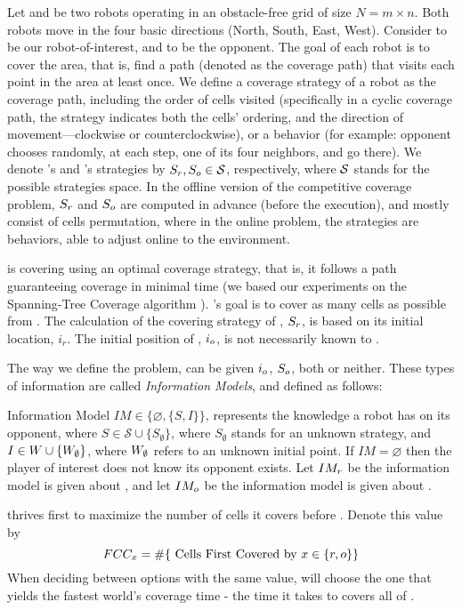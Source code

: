 Let \rob and \opp be two robots operating in an obstacle-free grid \w of size $N=m \times n$. Both robots move in the four basic directions (North, South, East, West). Consider \rob to be our robot-of-interest, and \opp to be the opponent. 
The goal of each robot is to cover the area, that is, find a path (denoted as the coverage path) that visits  each point in the area at least once. We define a coverage strategy of a robot as the coverage path, including the order of cells visited (specifically in a cyclic coverage path, the strategy indicates both the cells' ordering, and the direction of movement---clockwise or counterclockwise), or a behavior (for example: opponent chooses randomly, at each step, one of its four neighbors, and go there). We denote \rob's and \opp's strategies by $S_r,S_o\in \mathcal{S}$, respectively, where $\cal{S}$ stands for the possible strategies space. In the offline version of the competitive coverage problem, $S_r$ and $S_o$ are computed in advance (before the execution), and mostly consist of cells permutation, where in the online problem, the strategies are behaviors, able to adjust online to the environment.

\opp is covering \w using an optimal coverage strategy, that is, it follows a path guaranteeing coverage in minimal time (we based our experiments on the Spanning-Tree Coverage algorithm \cite{gabriely2001spanning}). \rob's goal is to cover as many cells as possible from . The calculation of the covering strategy of \rob, $S_r$, is based on its initial location, $i_r$. The initial position of \opp, $i_o$, is not necessarily known to \rob.

The way we define the problem, \rob can be given $i_o$, $S_o$, both or neither. These types of information are called {\em Information Models}, and defined as follows:
\begin{definition}
Information Model $IM \in \lbrace \varnothing, \lbrace S,I\rbrace \rbrace$, represents the knowledge a robot has on its opponent, where $S\in \mathcal{S} \cup \lbrace S_\emptyset \rbrace$, where $S_\emptyset$ stands for an unknown strategy, and $I \in W \cup \lbrace W_\emptyset \rbrace$, where $W_{\emptyset}$ refers to an unknown initial point.
If $IM=\varnothing$ then the player of interest does not know its opponent exists.
Let $IM_r$ be the information model \rob is given about \opp, and let $IM_o$ be the information model \opp is given about \rob.
\end{definition}
\rob thrives first to maximize the number of cells it covers before \opp. Denote this value by 
\begin{dmath*}[compact]
\fcc_{x}= 
\# \lbrace \textnormal{ Cells First Covered by } x \in \lbrace\rob,\opp\rbrace \rbrace 
\end{dmath*}
When deciding between options with the same \fcc value, \rob will choose the one that yields the fastest world's coverage time - the time it takes \rob to covers all of \w.

